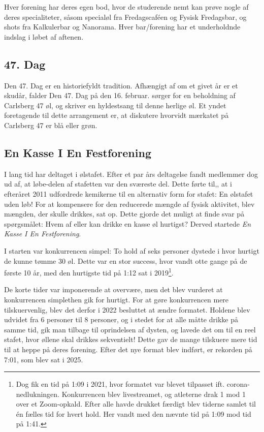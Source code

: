 Hver forening har deres egen bod, hvor de studerende nemt kan prøve nogle af deres specialiteter, såsom specialøl fra Fredagscaféen og Fysisk Fredagsbar, og shots fra Kalkulerbar og Nanorama. Hver bar/forening har et underholdnde indslag i løbet af aftenen.

\subsection{47. Dag}
Den 47. Dag er en historiefyldt tradition. Afhængigt af om et givet år er et skudår, falder Den 47. Dag på den 16. februar. \VC sørger for en beholdning af Carlsberg 47 øl, og \CERM skriver en hyldestsang til denne herlige øl. Et yndet foretagende til dette arrangement er, at diskutere hvorvidt mærkatet på Carlsberg 47 er blå eller grøn.

\subsection{En Kasse I En Festforening}
I lang tid har \TKET deltaget i \alkymias ølstafet. Efter et par års deltagelse fandt \TKETs medlemmer dog ud af, at løbe-delen af stafetten var den sværeste del. Dette førte til,, at \TKET i efteråret 2011 udfordrede kemikerne til en alternativ form for stafet: En ølstafet uden løb! For at kompensere for den reducerede mængde af fysisk aktivitet, blev mængden, der skulle drikkes, sat op. Dette gjorde det muligt at finde svar på spørgsmålet: Hvem af \TKET eller \alkymia kan drikke en kasse øl hurtigst? Derved startede \textit{En Kasse I En Festforening}.

I starten var konkurrencen simpel: To hold af seks personer dystede i hvor hurtigt de kunne tømme 30 øl. Dette var en stor success, hvor \TKET vandt otte gange på de første 10 år, med den hurtigste tid på 1:12 sat i 2019\footnote{Dog fik \TKET en tid på 1:09 i 2021, hvor formatet var blevet tilpasset ift. corona-nedlukningen. Konkurrencen blev livestreamet, og atleterne drak 1 mod 1 over et Zoom-opkald. Efter alle havde drukket færdigt blev tiderne samlet til én fælles tid for hvert hold. Her vandt \TKET med den nævnte tid på 1:09 mod \alkymias tid på 1:41.}.

De korte tider var imponerende at overvære, men det blev vurderet at konkurrencen simplethen gik for hurtigt. For at gøre konkurrencen mere tilskuervenlig, blev det derfor i 2022 besluttet at ændre formatet. Holdene blev udvidet fra 6 personer til 8 personer, og i stedet for at alle måtte drikke på samme tid, gik man tilbage til oprindelsen af dysten, og lavede det om til en reel stafet, hvor øllene skal drikkes sekventielt! Dette gav de mange tilskuere mere tid til at heppe på deres forening. Efter det nye format blev indført, er rekorden på 7:01, som blev sat i 2025. 

